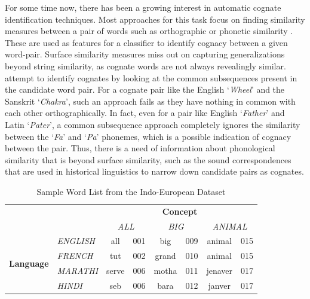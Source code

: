 \documentclass[11pt,letterpaper]{article}
\begin{document}
For some time now, there has been a growing interest in automatic cognate identification techniques. Most approaches for this task focus on finding similarity measures between a pair of words such as orthographic or phonetic similarity \cite{hauer2011clustering} \cite{inkpen2005similarity} \cite{List2016g}. These are used as features for a classifier to identify cognacy between a given word-pair. Surface similarity measures miss out on capturing generalizations beyond string similarity, as cognate words are not always revealingly similar. \cite{rama2015automatic} attempt to identify cognates by looking at the common subsequences present in the candidate word pair. For a cognate pair like the English `\textit{Wheel}' and the Sanskrit `\textit{Chakra}', such an approach fails as they have nothing in common with each other orthographically. In fact, even for a pair like English `\textit{Father}' and Latin `\textit{Pater}', a common subsequence approach completely ignores the similarity between the `\textit{Fa}' and `\textit{Pa}' phonemes, which is a possible indication of cognacy between the pair. Thus, there is a need of information about phonological similarity that is beyond surface similarity, such as the sound correspondences that are used in historical linguistics to narrow down candidate pairs as cognates.

\begin{table}[ht]
\centering
\begin{tabular}{llcccccc}
\multicolumn{1}{c}{\textbf{}}                           & \multicolumn{1}{c}{\textbf{}}         & \multicolumn{6}{c}{\textbf{Concept}}                                                                      \\ \cline{3-8} 
\multicolumn{1}{c}{}                                    & \multicolumn{1}{c}{\textit{}}         & \multicolumn{2}{c}{\textit{ALL}} & \multicolumn{2}{c}{\textit{BIG}} & \multicolumn{2}{c}{\textit{ANIMAL}} \\ \cline{3-8} 
\multicolumn{1}{l|}{\multirow{4}{*}{\textbf{Language}}} & \multicolumn{1}{l|}{\textit{ENGLISH}} & all   & \multicolumn{1}{c|}{001} & big   & \multicolumn{1}{c|}{009} & animal   & \multicolumn{1}{c|}{015} \\ \cline{3-8} 
\multicolumn{1}{l|}{}                                   & \multicolumn{1}{l|}{\textit{FRENCH}}  & tut   & \multicolumn{1}{c|}{002} & grand & \multicolumn{1}{c|}{010} & animal   & \multicolumn{1}{c|}{015} \\ \cline{3-8} 
\multicolumn{1}{l|}{}                                   & \multicolumn{1}{l|}{\textit{MARATHI}} & serve & \multicolumn{1}{c|}{006} & motha & \multicolumn{1}{c|}{011} & jenaver  & \multicolumn{1}{c|}{017} \\ \cline{3-8} 
\multicolumn{1}{l|}{}                                   & \multicolumn{1}{l|}{\textit{HINDI}}   & seb   & \multicolumn{1}{c|}{006} & bara  & \multicolumn{1}{c|}{012} & janver   & \multicolumn{1}{c|}{017} \\ \cline{3-8} 
\end{tabular}
\label{sample_wordlist}
\caption{Sample Word List from the Indo-European Dataset}
\end{table}
\end{document}
